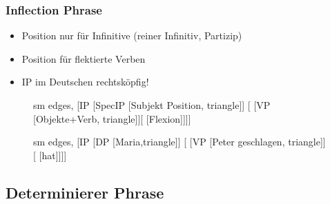 \begin{frame}
\frametitle{Inflection Phrase}

	\begin{itemize}
		\item {} \ras Position nur für Infinitive (reiner Infinitiv, Partizip)
		\item {} \ras Position für flektierte Verben
		\item IP im Deutschen \ras rechtsköpfig!		
	\end{itemize}


\begin{figure}[b]
  	\begin{minipage}[b]{0.45\textwidth}
	\centering
	\footnotesize{
		\begin{forest}
		sm edges,
		[IP [SpecIP [Subjekt Position, triangle]]
					[ [VP [Objekte+Verb, triangle]][ [Flexion]]]]
		\end{forest}
		}
  	\end{minipage}  
	\begin{minipage}[b]{0.45\textwidth}
	\centering
	\footnotesize{
		\begin{forest}
		sm edges,
		[IP [DP [Maria,triangle]]
					[ [VP [Peter geschlagen, triangle]][\zerobar{I} [hat]]]]
		\end{forest}
		}
  	\end{minipage}  
\end{figure}

\end{frame}


\subsection{Determinierer Phrase}


